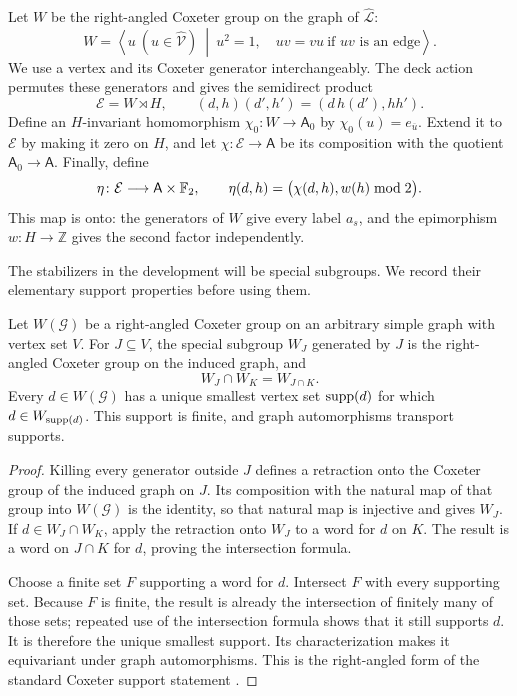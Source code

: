 Let $W$ be the right-angled Coxeter group on the graph of
$\widehat{\mathcal L}$:
\[
 W=\left\langle u\ (u\in\widehat{\mathcal V})\ \middle|\
 u^2=1,\quad uv=vu\ \text{if }uv\text{ is an edge}\right\rangle .
\]
We use a vertex and its Coxeter generator interchangeably.  The
deck action permutes these generators and gives the semidirect
product
\[
 \mathcal E=W\rtimes H,\qquad
 (d,h)(d',h')=(d\,h(d'),hh').
\]
Define an $H$-invariant homomorphism
$\chi_0\colon W\to\mathsf A_0$ by $\chi_0(u)=e_{\overline u}$.
Extend it to $\mathcal E$ by making it zero on $H$, and let
$\chi\colon\mathcal E\to\mathsf A$ be its composition with the
quotient $\mathsf A_0\to\mathsf A$.  Finally, define
\begin{equation}\label{ext:eta}
 \eta\colon\mathcal E\longrightarrow\mathsf A\times\mathbb F_2,\qquad
 \eta(d,h)=\bigl(\chi(d,h),w(h)\bmod 2\bigr).
\end{equation}
This map is onto: the generators of $W$ give every label $a_s$,
and the epimorphism $w\colon H\to\mathbb Z$ gives the second factor
independently.

The stabilizers in the development will be special subgroups.
We record their elementary support properties before using them.

\begin{lemma}\label{ext:support}
Let $W(\mathcal G)$ be a right-angled Coxeter group on an arbitrary
simple graph with vertex set $V$.  For $J\subseteq V$, the special
subgroup $W_J$ generated by $J$ is the right-angled Coxeter group on the induced
graph, and
\[
 W_J\cap W_K=W_{J\cap K}.
\]
Every $d\in W(\mathcal G)$ has a unique smallest vertex set
$\operatorname{supp}(d)$ for which $d\in W_{\operatorname{supp}(d)}$.  This support is
finite, and graph automorphisms transport supports.
\end{lemma}

\begin{proof}
Killing every generator outside $J$ defines a retraction onto
the Coxeter group of the induced graph on $J$.  Its composition
with the natural map of that group into $W(\mathcal G)$ is the
identity, so that natural map is injective and gives $W_J$.
If $d\in W_J\cap W_K$, apply the retraction onto $W_J$ to a word
for $d$ on $K$.  The result is a word on $J\cap K$ for $d$,
proving the intersection formula.

Choose a finite set $F$ supporting a word for $d$.  Intersect
$F$ with every supporting set.  Because $F$ is finite, the
result is already the intersection of finitely many of those
sets; repeated use of the intersection formula shows that it
still supports $d$.  It is therefore the unique smallest
support.  Its characterization makes it equivariant under graph
automorphisms.  This is the right-angled form of the standard
Coxeter support statement
\cite[Proposition~4.1.1 and Corollary~4.1.2]{Davis2008}.
\end{proof}

